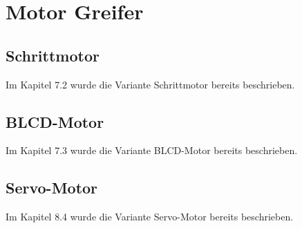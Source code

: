 
\section{Motor Greifer}


\subsection{Schrittmotor}
Im Kapitel 7.2 wurde die Variante Schrittmotor bereits beschrieben.

\subsection{BLCD-Motor}
Im Kapitel 7.3 wurde die Variante BLCD-Motor bereits beschrieben.

\subsection{Servo-Motor}
Im Kapitel 8.4 wurde die Variante Servo-Motor bereits beschrieben.
\pagebreak